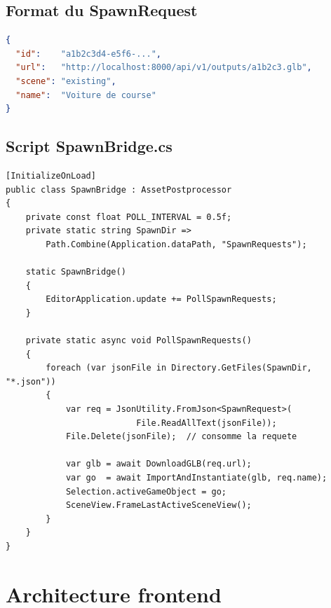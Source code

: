 \documentclass[12pt,a4paper,oneside]{report}
\begin{document}
\subsection{Format du SpawnRequest}

\begin{lstlisting}[language=json, caption={Fichier SpawnRequest.json}]
{
  "id":    "a1b2c3d4-e5f6-...",
  "url":   "http://localhost:8000/api/v1/outputs/a1b2c3.glb",
  "scene": "existing",
  "name":  "Voiture de course"
}
\end{lstlisting}

\subsection{Script SpawnBridge.cs}

\begin{lstlisting}[language={[Sharp]C},
  caption={SpawnBridge.cs — logique de spawn}]
[InitializeOnLoad]
public class SpawnBridge : AssetPostprocessor
{
    private const float POLL_INTERVAL = 0.5f;
    private static string SpawnDir =>
        Path.Combine(Application.dataPath, "SpawnRequests");

    static SpawnBridge()
    {
        EditorApplication.update += PollSpawnRequests;
    }

    private static async void PollSpawnRequests()
    {
        foreach (var jsonFile in Directory.GetFiles(SpawnDir, "*.json"))
        {
            var req = JsonUtility.FromJson<SpawnRequest>(
                          File.ReadAllText(jsonFile));
            File.Delete(jsonFile);  // consomme la requete

            var glb = await DownloadGLB(req.url);
            var go  = await ImportAndInstantiate(glb, req.name);
            Selection.activeGameObject = go;
            SceneView.FrameLastActiveSceneView();
        }
    }
}
\end{lstlisting}

\section{Architecture frontend}
\end{document}
